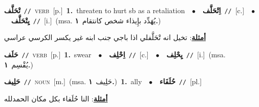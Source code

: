 \documentclass[10pt,a4paper,twoside]{article} %
\begin{document}
\begin{multicols}{2}
{\setlength\topsep{0pt}\textbf{\foreignlanguage{arabic}{تْحَلَّف}}\ {\color{gray}\texttt{//}\color{black}}\ \textsc{verb}\ [p.]\ \textbf{1.}~threaten to hurt sb as a retaliation\ \ $\bullet$\ \ \setlength\topsep{0pt}\textbf{\foreignlanguage{arabic}{اِتْحَلَّف}}\ {\color{gray}\texttt{//}\color{black}}\ [c.]\ \ $\bullet$\ \ \setlength\topsep{0pt}\textbf{\foreignlanguage{arabic}{يِتْحَلَّف}}\ {\color{gray}\texttt{//}\color{black}}\ [i.]\ \color{gray}(msa. \foreignlanguage{arabic}{يُهَدِّد بإِيذاء شخص كانتقام}~\foreignlanguage{arabic}{\textbf{١.}})\color{black}\  \begin{flushright}\color{gray}\foreignlanguage{arabic}{\textbf{\underline{\foreignlanguage{arabic}{أمثلة}}}: تخيل انه تْحَلَّفلي اذا باجي جنب ابنه غير يكسر الكرسي عراسي}\end{flushright}\color{black}} \vspace{2mm}

{\setlength\topsep{0pt}\textbf{\foreignlanguage{arabic}{حَلَف}}\ {\color{gray}\texttt{//}\color{black}}\ \textsc{verb}\ [p.]\ \textbf{1.}~swear\ \ $\bullet$\ \ \setlength\topsep{0pt}\textbf{\foreignlanguage{arabic}{اِحْلِف}}\ {\color{gray}\texttt{//}\color{black}}\ [c.]\ \ $\bullet$\ \ \setlength\topsep{0pt}\textbf{\foreignlanguage{arabic}{يِحْلِف}}\ {\color{gray}\texttt{//}\color{black}}\ [i.]\ \color{gray}(msa. \foreignlanguage{arabic}{يُقْسِم}~\foreignlanguage{arabic}{\textbf{١.}})\color{black}\ } \vspace{2mm}

{\setlength\topsep{0pt}\textbf{\foreignlanguage{arabic}{حَلِيف}}\ {\color{gray}\texttt{//}\color{black}}\ \textsc{noun}\ [m.]\ \color{gray}(msa. \foreignlanguage{arabic}{حَلِيف}~\foreignlanguage{arabic}{\textbf{١.}})\color{black}\ \textbf{1.}~ally\ \ $\bullet$\ \ \setlength\topsep{0pt}\textbf{\foreignlanguage{arabic}{حُلَفَاء}}\ {\color{gray}\texttt{//}\color{black}}\ [pl.]\  \begin{flushright}\color{gray}\foreignlanguage{arabic}{\textbf{\underline{\foreignlanguage{arabic}{أمثلة}}}: النا حُلَفاء بكل مكان الحمدلله}\end{flushright}\color{black}} \vspace{2mm}


\end{multicols}
\end{document}

